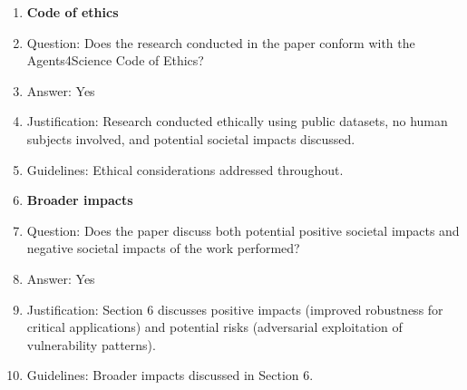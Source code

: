 \documentclass{article}
\begin{document}
\begin{enumerate}
\item {\bf Code of ethics}
    \item[] Question: Does the research conducted in the paper conform with the Agents4Science Code of Ethics?
    \item[] Answer: Yes
    \item[] Justification: Research conducted ethically using public datasets, no human subjects involved, and potential societal impacts discussed.
    \item[] Guidelines: Ethical considerations addressed throughout.

\item {\bf Broader impacts}
    \item[] Question: Does the paper discuss both potential positive societal impacts and negative societal impacts of the work performed?
    \item[] Answer: Yes
    \item[] Justification: Section 6 discusses positive impacts (improved robustness for critical applications) and potential risks (adversarial exploitation of vulnerability patterns).
    \item[] Guidelines: Broader impacts discussed in Section 6.

\end{enumerate}
\end{document}
